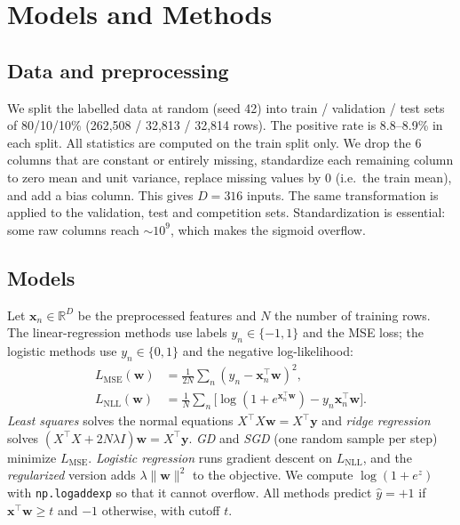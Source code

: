 \documentclass[10pt,conference,compsocconf]{IEEEtran}
\begin{document}
\section{Models and Methods}
\label{sec:methods}

\subsection{Data and preprocessing}
We split the labelled data at random (seed 42) into train / validation / test sets
of 80/10/10\% (262,508 / 32,813 / 32,814 rows). The positive rate is 8.8--8.9\% in
each split. All statistics are computed on the train split only. We drop the 6
columns that are constant or entirely missing, standardize each remaining column to
zero mean and unit variance, replace missing values by 0 (i.e.\ the train mean), and
add a bias column. This gives $D = 316$ inputs. The same transformation is applied
to the validation, test and competition sets. Standardization is essential: some
raw columns reach $\sim 10^9$, which makes the sigmoid overflow.

\subsection{Models}
Let $\mathbf{x}_n \in \mathbb{R}^D$ be the preprocessed features and $N$ the number
of training rows. The linear-regression methods use labels $y_n \in \{-1, 1\}$ and
the MSE loss; the logistic methods use $y_n \in \{0, 1\}$ and the negative
log-likelihood:
\begin{align*}
  L_{\text{MSE}}(\mathbf{w}) &= \tfrac{1}{2N} \textstyle\sum_n (y_n - \mathbf{x}_n^\top \mathbf{w})^2, \\
  L_{\text{NLL}}(\mathbf{w}) &= \tfrac{1}{N} \textstyle\sum_n \big[\log(1 + e^{\mathbf{x}_n^\top \mathbf{w}}) - y_n \mathbf{x}_n^\top \mathbf{w}\big].
\end{align*}
\emph{Least squares} solves the normal equations $X^\top X \mathbf{w} = X^\top \mathbf{y}$
and \emph{ridge regression} solves $(X^\top X + 2N\lambda I)\mathbf{w} = X^\top \mathbf{y}$.
\emph{GD} and \emph{SGD} (one random sample per step) minimize $L_{\text{MSE}}$.
\emph{Logistic regression} runs gradient descent on $L_{\text{NLL}}$, and the
\emph{regularized} version adds $\lambda \|\mathbf{w}\|^2$ to the objective. We
compute $\log(1 + e^z)$ with \texttt{np.logaddexp} so that it cannot overflow. All
methods predict $\hat y = +1$ if $\mathbf{x}^\top \mathbf{w} \ge t$ and $-1$ otherwise,
with cutoff $t$.
\end{document}
